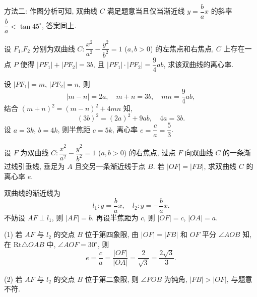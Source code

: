     方法二: 作图分析可知, 双曲线 $C$ 满足题意当且仅当渐近线 $y= \dfrac{b}a x$ 的斜率 $\dfrac{b}a< \tan 45^\circ$, 答案同上.
\endsolution

\begin{exercise}
    设 $F_1$,$F_2$ 分别为双曲线 $C\colon \dfrac{x^2}{a^2}- \dfrac{y^2}{b^2}=1$ ($a,b>0$) 的左焦点和右焦点, $C$ 上存在一点 $P$ 使得 $|PF_1| +|PF_2| =3b$, 且 $|PF_1|\cdot |PF_2| =\dfrac94 ab$, 求该双曲线的离心率.
\end{exercise}
\beginsolution
    设 $|PF_1|= m$, $|PF_2|= n$, 则
    \[|m-n|= 2a,\quad m+n= 3b,\quad mn= \frac94 ab,\]
    结合 $(m+n)^2= (m-n)^2+4mn$ 知,
    \[(3b)^2= (2a)^2+ 9ab,\quad 4a=3b.\]
    设 $a=3k$, $b=4k$, 则半焦距 $c=5k$, 离心率 $e= \dfrac{c}a= \dfrac53$.
\endsolution

\begin{exercise}
    设 $F$ 为双曲线 $C\colon \dfrac{x^2}{a^2}- \dfrac{y^2}{b^2}=1$ ($a,b>0$) 的右焦点, 过点 $F$ 向双曲线 $C$ 的一条渐过线引垂线, 垂足为 $A$ 且交另一条渐近线于点 $B$. 若 $|OF|= |FB|$, 求双曲线 $C$ 的离心率 $e$.
\end{exercise}
\beginsolution
    双曲线的渐近线为
    \[l_1\colon y= \frac{b}a x,\quad
    l_2\colon y= -\frac{b}a x.\]
    不妨设 $AF\perp l_1$, 则 $|AF|= b$. 再设半焦距为 $c$, 则 $|OF|= c$, $|OA|=a$.

    (1) 若 $AF$ 与 $l_2$ 的交点 $B$ 位于第四象限, 由 $|OF|= |FB|$ 和 $OF$ 平分 $\angle AOB$ 知, 在 $\mathrm{Rt}\triangle OAB$ 中, $\angle AOF= 30^\circ$, 则
    \[e= \frac{c}a= \frac{|OF|}{|OA|}
        = \frac{2}{\sqrt3}= \frac{2\sqrt3}{3}.\]

    (2) 若 $AF$ 与 $l_2$ 的交点 $B$ 位于第二象限, 则 $\angle FOB$ 为钝角, $|FB|> |OF|$, 与题意不符.
\endsolution
